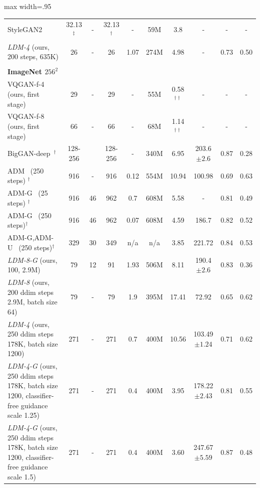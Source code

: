 {\begin{table}[thbp]
\begin{center}
\begin{adjustbox}{max width=.95\textwidth}
\begin{tabular}{lccccccccc}
StyleGAN2~\cite{DBLP:journals/corr/abs-1912-04958}& 32.13$^\ddagger$ & - & 32.13$^\dagger$  & - &  59M & 3.8 & - & - & - \\
\emph{LDM-4} (ours, 200 steps, 635K)& 26 & - & 26 & 1.07 & 274M & 4.98& - & 0.73 & 0.50 \\
&&&&&&&&&\\
\textbf{ImageNet $256^{2}$} &&&&&&&&& \\
\midrule
VQGAN-f-4 (ours, first stage)& 29 & - & 29 & - & 55M & 0.58$^{\dagger\dagger}$& - & - & - \\
VQGAN-f-8 (ours, first stage) & 66 & - & 66 & - & 68M & 1.14$^{\dagger\dagger}$& - & - & - \\
\midrule
BigGAN-deep~\cite{bigganbrock}$^\dagger$& 128-256 & & 128-256 & - & 340M & 6.95 & 203.6\tiny$\pm\text{2.6}$ & 0.87 & 0.28\\
ADM~\cite{DBLP:journals/corr/abs-2105-05233} (250 steps) $^\dagger$& 916 & - & 916 & 0.12 & 554M & 10.94& 100.98 & 0.69 & 0.63 \\
ADM-G~\cite{DBLP:journals/corr/abs-2105-05233} (25 steps) $^\dagger$& 916 & 46 & 962 & 0.7 & 608M & 5.58 & - & 0.81  & 0.49 \\
ADM-G~\cite{DBLP:journals/corr/abs-2105-05233} (250 steps)$^\dagger$& 916 & 46 & 962 & 0.07 & 608M & 4.59 & 186.7 & 0.82 & 0.52 \\
ADM-G,ADM-U~\cite{DBLP:journals/corr/abs-2105-05233} (250 steps)$^\dagger$& 329 & 30 & 349 & n/a & n/a & 3.85  & 221.72 & 0.84 & 0.53 \\
%
%
%
%
\emph{LDM-8-G} (ours, 100, 2.9M)& 79 & 12 & 91 & 1.93 & 506M & 8.11 & 190.4\tiny$\pm\text{2.6}$  & 0.83 & 0.36 \\
%
%
\emph{LDM-8} (ours, 200 ddim steps 2.9M, batch size 64)& 79 & - & 79 & 1.9 & 395M & 17.41 & 72.92 & 0.65 & 0.62 \\
\emph{LDM-4} (ours, 250 ddim steps 178K, batch size 1200)& 271 & - & 271 & 0.7 & 400M & 10.56 & 103.49\tiny$\pm\text{1.24}$  & 0.71  & 0.62 \\
\emph{LDM-4-G} (ours, 250 ddim steps 178K, batch size 1200, classifier-free guidance~\cite{ho2021classifier} scale 1.25)& 271 & - & 271 & 0.4 & 400M & 3.95 & 178.22\tiny$\pm\text{2.43}$  & 0.81  & 0.55 \\
\emph{LDM-4-G} (ours, 250 ddim steps 178K, batch size 1200, classifier-free guidance~\cite{ho2021classifier} scale 1.5)& 271 & - & 271 & 0.4 & 400M & 3.60 & 247.67\tiny$\pm\text{5.59}$  & 0.87  & 0.48 \\


%
%
\bottomrule
\end{tabular}



\end{adjustbox}
\end{center}
\end{table}}
